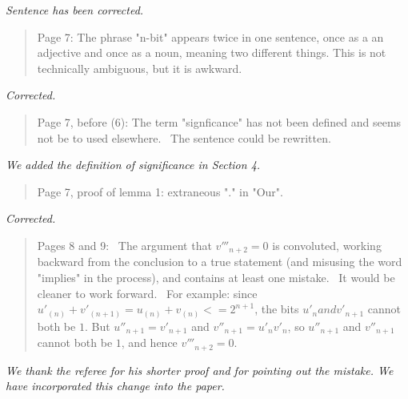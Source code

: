 \documentclass{article}
\theoremstyle{plain} \newtheorem{lemma}{Lemma}
\begin{document}
{\it Sentence has been corrected.}

\begin{quote}
Page 7: The phrase "n-bit" appears twice in one sentence, once as a
an adjective and once as a noun, meaning two different things. This is
not technically ambiguous, but it is awkward.
\end{quote}

{\it Corrected.}

\begin{quote}
Page 7, before (6): The term "signficance" has not been defined and
seems not be to used elsewhere.  The sentence could be rewritten.
\end{quote}

{\it We added the definition of significance in Section 4.}

\begin{quote}
Page 7, proof of lemma 1: extraneous "." in "Our".
\end{quote}

{\it Corrected.}

\begin{quote}
Pages 8 and 9:  The argument that $v'''_{n+2} = 0$ is convoluted, working
backward from the conclusion to a true statement (and misusing the word
"implies" in the process), and contains at least one mistake.  It would be
cleaner to work forward.  For example: since $u'_{(n)} + v'_{(n+1)} =
u_{(n)} + v_{(n)} <= 2^{n+1}$, the bits $u'_n and v'_{n+1}$ cannot both be $1$.
But $u''_{n+1} = v'_{n+1}$ and $v''_{n+1} = u'_n v'_n$, so $u''_{n+1}$ and
$v''_{n+1}$ cannot both be $1$, and hence $v'''_{n+2} = 0$.
\end{quote}

{\it We thank the referee for his shorter proof and for pointing out the
mistake. We have incorporated this change into the paper.}



\end{document}
